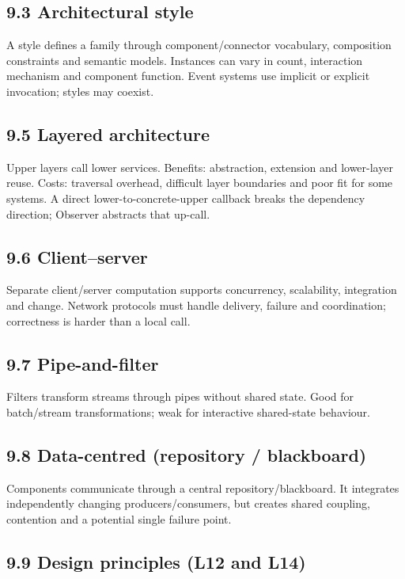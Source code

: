 \begin{studycolumns}
\vspace{0pt}
\subsection*{9.3 Architectural style}
A style defines a family through component/\allowbreak{}connector vocabulary, composition constraints and semantic models. Instances can vary in count, interaction mechanism and component function. Event systems use implicit or explicit invocation; styles may coexist.
\subsection*{9.5 Layered architecture}
Upper layers call lower services. Benefits: abstraction, extension and lower-layer reuse. Costs: traversal overhead, difficult layer boundaries and poor fit for some systems. A direct lower-to-concrete-upper callback breaks the dependency direction; Observer abstracts that up-call.
\subsection*{9.6 Client--server}
Separate client/\allowbreak{}server computation supports concurrency, scalability, integration and change. Network protocols must handle delivery, failure and coordination; correctness is harder than a local call.
\subsection*{9.7 Pipe-and-filter}
Filters transform streams through pipes without shared state. Good for batch/\allowbreak{}stream transformations; weak for interactive shared-state behaviour.
\subsection*{9.8 Data-centred (repository /\allowbreak{} blackboard)}
Components communicate through a central repository/\allowbreak{}blackboard. It integrates independently changing producers/\allowbreak{}consumers, but creates shared coupling, contention and a potential single failure point.
\end{studycolumns}

\subsection*{9.9 Design principles (L12 and L14)}

